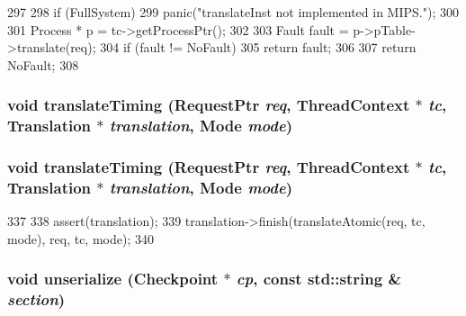 \begin{DoxyCode}
297 {
298     if (FullSystem)
299         panic("translateInst not implemented in MIPS.\n");
300 
301     Process * p = tc->getProcessPtr();
302 
303     Fault fault = p->pTable->translate(req);
304     if (fault != NoFault)
305         return fault;
306 
307     return NoFault;
308 }
\end{DoxyCode}
\hypertarget{classMipsISA_1_1TLB_ae52f7e465748883695d2b4f432a13652}{
\subsubsection[{translateTiming}]{\setlength{\rightskip}{0pt plus 5cm}void translateTiming ({\bf RequestPtr} {\em req}, \/  {\bf ThreadContext} $\ast$ {\em tc}, \/  {\bf Translation} $\ast$ {\em translation}, \/  {\bf Mode} {\em mode})}}
\label{classMipsISA_1_1TLB_ae52f7e465748883695d2b4f432a13652}
\hypertarget{classMipsISA_1_1TLB_ae52f7e465748883695d2b4f432a13652}{
\subsubsection[{translateTiming}]{\setlength{\rightskip}{0pt plus 5cm}void translateTiming ({\bf RequestPtr} {\em req}, \/  {\bf ThreadContext} $\ast$ {\em tc}, \/  {\bf Translation} $\ast$ {\em translation}, \/  {\bf Mode} {\em mode})}}
\label{classMipsISA_1_1TLB_ae52f7e465748883695d2b4f432a13652}



\begin{DoxyCode}
337 {
338     assert(translation);
339     translation->finish(translateAtomic(req, tc, mode), req, tc, mode);
340 }
\end{DoxyCode}
\hypertarget{classMipsISA_1_1TLB_af22e5d6d660b97db37003ac61ac4ee49}{
\subsubsection[{unserialize}]{\setlength{\rightskip}{0pt plus 5cm}void unserialize ({\bf Checkpoint} $\ast$ {\em cp}, \/  const std::string \& {\em section})}}
\label{classMipsISA_1_1TLB_af22e5d6d660b97db37003ac61ac4ee49}


